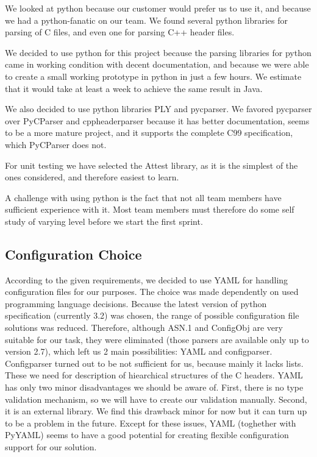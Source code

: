 We looked at python because our customer would prefer us to use it, and because
we had a python-fanatic on our team. We found several python libraries for
parsing of C files, and even one for parsing C++ header files.

We decided to use python for this project because the parsing libraries for
python came in working condition with decent documentation, and because we
were able to create a small working prototype in python in just a few hours.
We estimate that it would take at least a week to achieve the same result in
Java.

We also decided to use python libraries PLY and pycparser. We favored pycparser
over PyCParser and cppheaderparser because it has better documentation, seems
to be a more mature project, and it supports the complete C99 specification,
which PyCParser does not.

For unit testing we have selected the Attest library, as it is the simplest of
the ones considered, and therefore easiest to learn.

A challenge with using python is the fact that not all team members have
sufficient experience with it. Most team members must therefore do some self
study of varying level before we start the first sprint.

\subsection{Configuration Choice}
\label{sec:pre:configchoice}
According to the given requirements, we decided to use YAML for handling
configuration files for our purposes. The choice was made dependently on used
programming language decisions. Because the latest version of python
specification (currently 3.2) was chosen, the range of possible configuration
file solutions was reduced. Therefore, although ASN.1 and ConfigObj are very
suitable for our task, they were eliminated (those parsers are available only
up to version 2.7), which left us 2 main possibilities: YAML and configparser.
Configparser turned out to be not sufficient for us, because mainly it lacks
lists. These we need for description of hiearchical structures of the C
headers. YAML has only two minor disadvantages we should be aware of. First,
there is no type validation mechanism, so we will have to create our validation
manually. Second, it is an external library. We find this drawback minor for
now but it can turn up to be a problem in the future. Except for these issues,
YAML (toghether with PyYAML) seems to have a good potential for creating
flexible configuration support for our solution.


